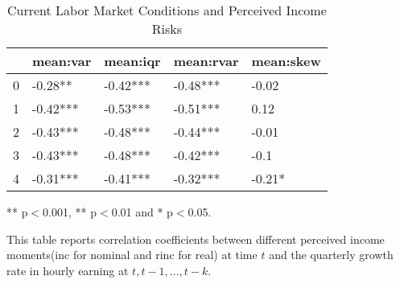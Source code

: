 
\begin{table}[ht]
\centering
\begin{adjustbox}{width={\textwidth}}
\begin{threeparttable}
\caption{Current Labor Market Conditions and Perceived Income Risks}
\label{macro_corr_he}
\begin{tabular}{lllll}
\toprule
{} &  mean:var &  mean:iqr & mean:rvar & mean:skew \\
\midrule
0 &   -0.28** &  -0.42*** &  -0.48*** &     -0.02 \\
1 &  -0.42*** &  -0.53*** &  -0.51*** &      0.12 \\
2 &  -0.43*** &  -0.48*** &  -0.44*** &     -0.01 \\
3 &  -0.43*** &  -0.48*** &  -0.42*** &      -0.1 \\
4 &  -0.31*** &  -0.41*** &  -0.32*** &    -0.21* \\
\bottomrule
\end{tabular}
\begin{tablenotes}
\item *** p$<$0.001, ** p$<$0.01 and * p$<$0.05.
\item This table reports correlation coefficients between different perceived income moments(inc for nominal
and rinc for real) at time
$t$ and the quarterly growth rate in hourly earning at $t,t-1,...,t-k$.
\end{tablenotes}
\end{threeparttable}
\end{adjustbox}
\end{table}